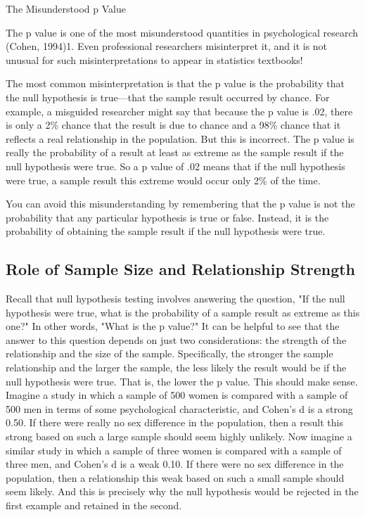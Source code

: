 The Misunderstood p Value


The p value is one of the most misunderstood quantities in psychological research (Cohen, 1994)1. Even professional researchers misinterpret it, and it is not unusual for such misinterpretations to appear in statistics textbooks!


The most common misinterpretation is that the p value is the probability that the null hypothesis is true---that the sample result occurred by chance. For example, a misguided researcher might say that because the p value is .02, there is only a 2\% chance that the result is due to chance and a 98\% chance that it reflects a real relationship in the population. But this is incorrect. The p value is really the probability of a result at least as extreme as the sample result if the null hypothesis were true. So a p value of .02 means that if the null hypothesis were true, a sample result this extreme would occur only 2\% of the time.


You can avoid this misunderstanding by remembering that the p value is not the probability that any particular hypothesis is true or false. Instead, it is the probability of obtaining the sample result if the null hypothesis were true.



\subsection{Role of Sample Size and Relationship Strength}




Recall that null hypothesis testing involves answering the question, "If the null hypothesis were true, what is the probability of a sample result as extreme as this one?" In other words, "What is the p value?" It can be helpful to see that the answer to this question depends on just two considerations: the strength of the relationship and the size
of the sample. Specifically, the stronger the sample relationship and the larger the sample, the less likely the result would be if the null hypothesis were true. That is, the lower the p value. This should make sense. Imagine a study in which a sample of 500 women is compared with a sample of 500 men in terms of some psychological characteristic, and Cohen's d is a strong 0.50. If there were really no sex difference in the population, then a result this strong based on such a large sample should seem highly unlikely. Now imagine a similar study in which a sample of three women is compared with a sample of three men, and Cohen's d is a weak 0.10. If there were no sex difference in the population, then a relationship this weak based on such a small sample should seem likely. And this is precisely why the null hypothesis would be rejected in the first example and retained in the second.




